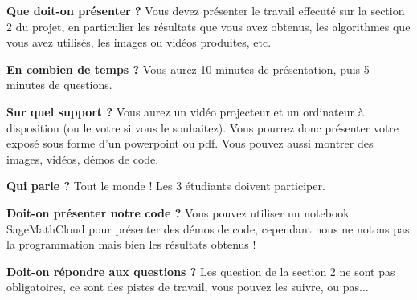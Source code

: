 \smallskip
\textbf{Que doit-on présenter ?} Vous devez présenter le travail effecuté sur la section 2 du projet, en particulier les résultats que vous avez obtenus, les algorithmes que vous avez utilisés, les images ou vidéos produites, etc.

\smallskip
\textbf{En combien de temps ?} Vous aurez 10 minutes de présentation, puis 5 minutes de questions.

\smallskip
\textbf{Sur quel support ?} Vous aurez un vidéo projecteur et un ordinateur à disposition (ou le votre si vous le souhaitez). Vous pourrez donc présenter votre exposé sous forme d'un powerpoint ou pdf. Vous pouvez aussi montrer des images, vidéos, démos de code.

\smallskip
\textbf{Qui parle ?} Tout le monde ! Les 3 étudiants doivent participer.

\smallskip
\textbf{Doit-on présenter notre code ?} Vous pouvez utiliser un notebook SageMathCloud pour présenter des démos de code, cependant nous ne notons pas la programmation mais bien les résultats obtenus !

\smallskip
\textbf{Doit-on répondre aux questions ?} Les question de la section 2 ne sont pas obligatoires, ce sont des pistes de travail, vous pouvez les suivre, ou pas...
